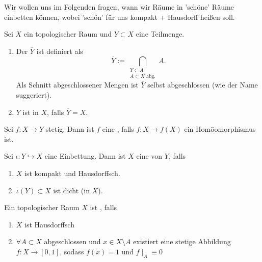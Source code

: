 Wir wollen uns im Folgenden fragen, wann wir Räume in 'schöne' Räume einbetten können, wobei 'schön' für uns kompakt + Hausdorff heißen soll.

\begin{definition} \label{def:abschluss-dichtheit}
    Sei $X$ ein topologischer Raum und $Y\subset X$ eine Teilmenge.
    \begin{enumerate}[1)]
        \item Der  $\overline{Y}$ ist definiert als
            \[
            \overline{Y} := \bigcap_{\substack{Y\subset A \\ A\subset X \text{ abg.}} } A
            .\] 
            Als Schnitt abgeschlossener Mengen ist $\overline{Y}$ selbst abgeschlossen (wie der Name suggeriert).
        \item  $Y$ ist  in $X$, falls  $\overline{Y} = X$.
    \end{enumerate}
\end{definition}
\begin{definition}[Einbettung]\label{def:einbettung}
    Sei $f:X\to Y$ stetig. Dann ist $f$ eine  , falls $f: X \to  f(X)$ ein Homöomorphismus ist.
\end{definition}
\begin{definition}[Kompaktifizierung] \label{def:kompaktifizierung}
    Sei $ι: Y\hookrightarrow X$ eine Einbettung. Dann ist $X$ eine  von $Y$, falls
    \begin{enumerate}[1)]
        \item $X$ ist kompakt und Hausdorffsch.
        \item  $ι(Y)\subset X$ ist dicht (in $X$).
    \end{enumerate}
\end{definition}
\begin{definition}\label{def:vollständig-regulär}
    Ein topologischer Raum $X$ ist  , falls
    \begin{enumerate}[1)]
        \item $X$ ist Hausdorffsch
        \item  $\forall A\subset X$ abgeschlossen und $x\in X\setminus A$ existiert eine stetige Abbildung $f:X \to  [0,1]$, sodass $f(x) = 1$ und  $f\mid _A \equiv 0$
    \end{enumerate}
\end{definition}
